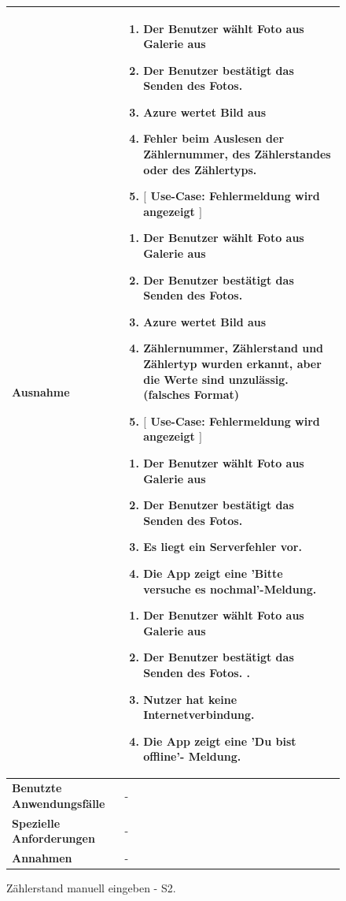 \begin{figure}[h]
	\centering
	\begin{tabularx}{\textwidth}{ X | X } \hline
		\textbf{Ausnahme} &
		\begin{enumerate}
			\item Der Benutzer wählt Foto aus Galerie aus
			\item Der Benutzer bestätigt das Senden des Fotos.  
			\item Azure wertet Bild aus 
			\item Fehler beim Auslesen der Zählernummer, des Zählerstandes oder des Zählertyps. 
			\item $\lbrack$ Use-Case: Fehlermeldung wird angezeigt $\rbrack$ 
		\end{enumerate} 
		\begin{enumerate}
			\item Der Benutzer wählt Foto aus Galerie aus
			\item Der Benutzer bestätigt das Senden des Fotos. 
			\item Azure wertet Bild aus 
			\item Zählernummer, Zählerstand und Zählertyp wurden erkannt, aber die Werte sind unzulässig. (falsches Format) 
			\item $\lbrack$ Use-Case: Fehlermeldung wird angezeigt $\rbrack$ 
		\end{enumerate}  
		\begin{enumerate}
			\item Der Benutzer wählt Foto aus Galerie aus
			\item Der Benutzer bestätigt das Senden des Fotos. 
			\item Es liegt ein Serverfehler vor. 
			\item Die App zeigt eine ’Bitte versuche es nochmal’-Meldung. 
		\end{enumerate}
		\begin{enumerate}
			\item Der Benutzer wählt Foto aus Galerie aus 
			\item Der Benutzer bestätigt das Senden des Fotos. . 
			\item Nutzer hat keine Internetverbindung. 
			\item Die App zeigt eine ’Du bist offline’- Meldung.
		\end{enumerate} \\ \hline
		\textbf{Benutzte Anwendungsfälle} & - \\ \hline
		\textbf{Spezielle Anforderungen} & - \\ \hline
		\textbf{Annahmen} & - \\ \hline
	\end{tabularx}
	\caption{Zählerstand manuell eingeben - S2.}
	\label{fig:anwendungsfall-server-tabelle-xx-1}
\end{figure}

